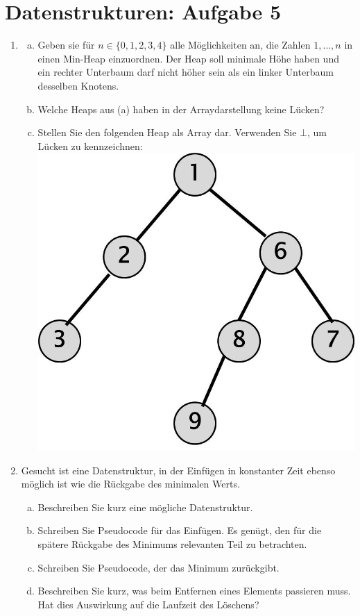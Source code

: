 \documentclass{scrartcl}
\begin{document}
\section*{Datenstrukturen: Aufgabe 5}
\begin{enumerate}[(1)]

\item
\begin{enumerate}[(a)]
\item Geben sie f\"ur $n\in \{0,1,2,3,4\}$ alle M\"oglichkeiten an, die Zahlen $1,\dots,n$ in einen Min-Heap einzuordnen. Der Heap soll minimale H\"ohe haben und ein rechter Unterbaum darf nicht h\"oher sein als ein linker Unterbaum desselben Knotens.
\item Welche Heaps aus (a) haben in der Arraydarstellung keine L\"ucken?
\item Stellen Sie den folgenden Heap als Array dar. Verwenden Sie $\bot$, um L\"ucken zu kennzeichnen:\newline
{\center\includegraphics[scale=0.3]{images/Heap.jpg}}
\end{enumerate}

\item
Gesucht ist eine Datenstruktur, in der Einf\"ugen in konstanter Zeit ebenso m\"oglich ist wie die R\"uckgabe des minimalen Werts.
\begin{enumerate}[(a)]
\item Beschreiben Sie kurz eine m\"ogliche Datenstruktur.
\item Schreiben Sie Pseudocode f\"ur das Einf\"ugen. Es gen\"ugt, den f\"ur die sp\"atere R\"uckgabe des Minimums relevanten Teil zu betrachten.
\item Schreiben Sie Pseudocode, der das Minimum zur\"uckgibt.
\item Beschreiben Sie kurz, was beim Entfernen eines Elements passieren muss. Hat dies Auswirkung auf die Laufzeit des L\"oschens?
\end{enumerate}


\end{enumerate}
\end{document}
